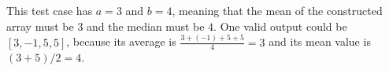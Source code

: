 This test case has $a=3$ and $b=4$, meaning that the mean of the constructed array must be $3$ and the median must be $4$.
One valid output could be $[3, -1, 5, 5]$, because its average is $\frac{3+(-1)+5+5}{4}=3$ and its mean value is $(3+5)/2=4$.